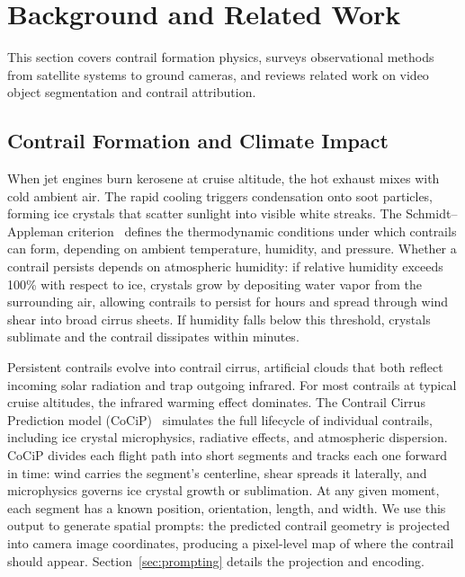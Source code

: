 \documentclass[review]{elsarticle}
\begin{document}
\section{Background and Related Work}

This section covers contrail formation physics, surveys observational methods from satellite systems to ground cameras, and reviews related work on video object segmentation and contrail attribution.

\subsection{Contrail Formation and Climate Impact}
\label{sec:contrail_formation}

When jet engines burn kerosene at cruise altitude, the hot exhaust mixes with cold ambient air. The rapid cooling triggers condensation onto soot particles, forming ice crystals that scatter sunlight into visible white streaks. The Schmidt--Appleman criterion~\cite{schmidt1941entstehung, appleman1953formation, Schumann1996} defines the thermodynamic conditions under which contrails can form, depending on ambient temperature, humidity, and pressure. Whether a contrail persists depends on atmospheric humidity: if relative humidity exceeds 100\% with respect to ice, crystals grow by depositing water vapor from the surrounding air, allowing contrails to persist for hours and spread through wind shear into broad cirrus sheets. If humidity falls below this threshold, crystals sublimate and the contrail dissipates within minutes.

Persistent contrails evolve into contrail cirrus, artificial clouds that both reflect incoming solar radiation and trap outgoing infrared. For most contrails at typical cruise altitudes, the infrared warming effect dominates. The Contrail Cirrus Prediction model (CoCiP)~\cite{schumann2012cocip} simulates the full lifecycle of individual contrails, including ice crystal microphysics, radiative effects, and atmospheric dispersion. CoCiP divides each flight path into short segments and tracks each one forward in time: wind carries the segment's centerline, shear spreads it laterally, and microphysics governs ice crystal growth or sublimation. At any given moment, each segment has a known position, orientation, length, and width. We use this output to generate spatial prompts: the predicted contrail geometry is projected into camera image coordinates, producing a pixel-level map of where the contrail should appear. Section~\ref{sec:prompting} details the projection and encoding.
\end{document}
